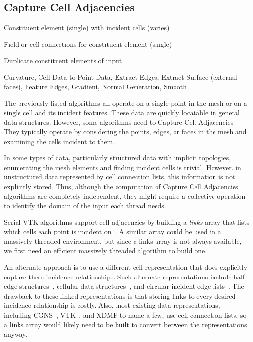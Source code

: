 \documentclass{sig-alternate}
\newcommand*{\lcite}[1]{~\cite{#1}}
\newcommand*{\keyterm}[1]{\emph{#1}}
\newcommand{\algclass}[1]{\textsf{#1}}
\newcommand{\algorithmclasssection}[1]{\subsection*{#1}}
\newcommand{\algorithmclass}[5]{
  \algorithmclasssection{#1} %
  \begin{description}[leftmargin=9em,style=nextline,noitemsep]
    \raggedright
  \item[Input] #2
  \item[Output] #3
  \item[Interdependence] #4
  \item[Algorithms] #5
  \end{description}
}
\begin{document}
\algorithmclass{Capture Cell Adjacencies}
               {Constituent element (single) with incident cells (varies)} %
               {Field or cell connections for constituent element (single)} %
               {Duplicate constituent elements of input} %
               {
                 Curvature,
                 Cell Data to Point Data,
                 Extract Edges,
                 Extract Surface (external faces),
                 Feature Edges,
                 Gradient,
                 Normal Generation,
                 Smooth
               }

\noindent
The previously listed algorithms all operate on a single point in the mesh
or on a single cell and its incident features. These data are quickly
locatable in general data structures. However, some algorithms need to
\algclass{Capture Cell Adjacencies}. They typically operate by considering
the points, edges, or faces in the mesh and examining the cells incident to
them.

In some types of data, particularly structured data with implicit
topologies, enumerating the mesh elements and finding incident cells is
trivial. However, in unstructured data represented by cell connection
lists, this information is not explicitly stored. Thus, although the
computation of \algclass{Capture Cell Adjacencies} algorithms are
completely independent, they might require a collective operation to
identify the domain of the input each thread needs.

Serial VTK algorithms support cell adjacencies by building a
\keyterm{links} array that lists which cells each point is incident
on\lcite{VTKUsersGuide}. A similar array could be used in a massively
threaded environment, but since a links array is not always available, we
first need an efficient massively threaded algorithm to build one.

An alternate approach is to use a different cell representation that does
explicitly capture these incidence relationships. Such alternate
representations include half-edge structures\lcite{Kettner1998}, cellular
data structures\lcite{Alumbaugh2005}, and circular incident edge
lists\lcite{Levy2001}. The drawback to these linked representations is that
storing links to every desired incidence relationship is costly. Also, most
existing data representations, including CGNS\lcite{CGNS}, VTK\lcite{VTK},
and XDMF to name a few, use cell connection lists, so a links array would
likely need to be built to convert between the representations anyway.
\end{document}

